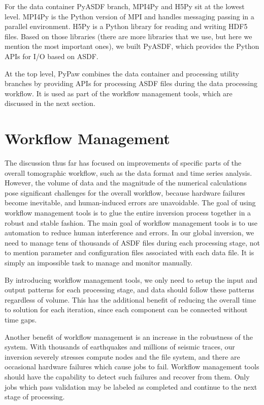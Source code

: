 For the data container PyASDF branch, MPI4Py and H5Py sit at the lowest level. MPI4Py is the Python version of MPI and handles messaging passing in a parallel environment.
H5Py is a Python library for reading and writing HDF5 files.
Based on those libraries (there are more libraries that we use, but here we mention the most important ones), we built
PyASDF, which provides the Python APIs for I/O based on ASDF.

At the top level, PyPaw combines the data container and processing utility branches
by providing APIs for processing ASDF files during the data processing workflow.
It is used as part of the workflow management tools, which are discussed in the next section.

\section{Workflow Management}
\label{section:workflow_management}

The discussion thus far has focused on improvements of specific parts of the overall tomographic workflow,
such as the data format and time series analysis.
However, the volume of data and the magnitude of the numerical calculations
pose significant challenges for the overall workflow,
because hardware failures become inevitable, and human-induced errors are unavoidable.
The goal of using workflow management tools is to glue the entire inversion process together in a robust and stable fashion.
The main goal of workflow management tools is to use automation to
reduce human interference and errors.
In our global inversion,
we need to manage tens of thousands of ASDF files during each processing stage,
not to mention parameter and configuration files associated with
each data file. It is simply an impossible task to manage and monitor
manually.

By introducing workflow management tools,
we only need to setup the input and output
patterns for each processing stage, and data should
follow these patterns regardless of volume.
This has the additional benefit of reducing the overall time to solution for each iteration, since
each component can be connected without time gaps. 

Another benefit of workflow management is an increase in the robustness of the system.
With thousands of earthquakes and millions of seismic traces,
our inversion severely stresses compute nodes and the file system, and there are occasional hardware failures which cause jobs to fail.
Workflow management tools should have the capability to
detect such failures and recover from them.
Only jobs which pass validation may be labeled as completed and continue to the next stage of processing.

